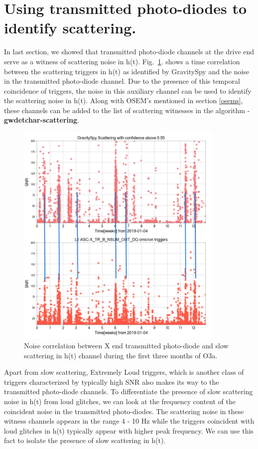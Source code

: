 \documentclass[12pt]{iopart}
\begin{document}
 
\section{Using transmitted photo-diodes to identify scattering.}\label{transmonwitness}
In last section, we showed that transmitted photo-diode channels at the drive end serve as a witness of scattering noise in h(t). Fig.~\ref{fig:transetmx}. shows a time correlation between the scattering triggers in h(t) as identified by GravitySpy and the noise in the transmitted photo-diode channel. Due to the presence of this temporal coincidence of triggers, the noise in this auxiliary channel can be used to identify the scattering noise in h(t). Along with OSEM’s mentioned in section \ref{osems}, these channels can be added to the list of scattering witnesses in the algorithm - \textbf{gwdetchar-scattering}.

\begin{figure}[h]
   \centering
         \includegraphics[width = 10cm]{htxtrbo3b.eps}
         \caption{Noise correlation between X end transmitted photo-diode and slow scattering in h(t) channel during the first three months of O3a.}
    \label{fig:transetmx}
\end{figure}

Apart from slow scattering, Extremely Loud triggers, which is another class of triggers characterized by typically high SNR also makes its way to the transmitted photo-diode channels. To differentiate the presence of slow scattering noise in h(t) from loud glitches, we can look at the frequency content of the coincident noise in the transmitted photo-diodes. The scattering noise in these witness channels appears in the range  4 - 10 Hz while the triggers coincident with loud glitches in h(t) typically appear with higher peak frequency. We can use this fact to isolate the presence of slow scattering in h(t).
\end{document}
